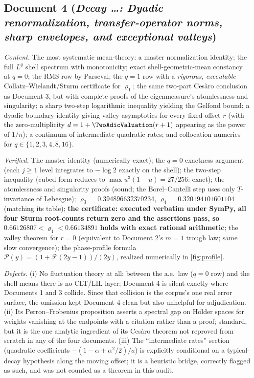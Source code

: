 \documentclass[11pt,oneside]{article}
\theoremstyle{definition}
\theoremstyle{remark}
\begin{document}
\subsection{Document 4 (\emph{Decay \dots: Dyadic renormalization,
transfer-operator norms, sharp envelopes, and exceptional valleys})}

\emph{Content.}  The most systematic mean-theory: a master normalization
identity; the full $L^q$ shell spectrum with monotonicity; exact
shell-geometric-mean constancy at $q=0$; the RMS row by Parseval; the
$q=1$ row with a \emph{rigorous, executable} Collatz--Wielandt/Sturm
certificate for $\varrho_1$; the same two-part Ces\`aro conclusion as
Document 3, but with complete proofs of the eigenmeasure's atomlessness
and singularity; a sharp two-step logarithmic inequality yielding the
Gelfond bound; a dyadic-boundary identity giving valley asymptotics for
every fixed offset $r$ (with the zero-multiplicity $d=1+\TwoAdicValuation(r+1)$
appearing as the power of $1/n$); a continuum of intermediate quadratic
rates; and collocation numerics for $q\in\{1,2,3,4,8,16\}$.

\emph{Verified.}  The master identity (numerically exact); the $q=0$
exactness argument (each $j\ge1$ level integrates to $-\log2$ exactly on
the shell); the two-step inequality (cubed form reduces to
$\max u^3(1-u)=27/256$: exact); the atomlessness and singularity proofs
(sound; the Borel--Cantelli step uses only $T$-invariance of Lebesgue);
$\varrho_3=0.394896632370234$, $\varrho_4=0.320194101601104$ (matching
its table); \textbf{the certificate: executed verbatim under SymPy,
all four Sturm root-counts return zero and the assertions pass, so}
$0.66126807<\varrho_1<0.66134891$ \textbf{holds with exact rational
arithmetic}; the valley theorem for $r=0$ (equivalent to Document 2's
$m=1$ trough law; same slow convergence); the phase-profile formula
$\mathscr P(y)=(1+\mathscr F(2y-1))/(2y)$, realized numerically in
\cref{fig:profile}.

\emph{Defects.}
(i) No fluctuation theory at all: between the a.e.\ law ($q=0$ row) and
the shell means there is no CLT/LIL layer; Document 4 is silent exactly
where Documents 1 and 3 collide.  Since that collision is the corpus's
one real error surface, the omission kept Document 4 clean but also
unhelpful for adjudication.
(ii) Its Perron--Frobenius proposition asserts a spectral gap on
H\"older spaces for weights vanishing at the endpoints with a citation
rather than a proof; standard, but it is the one analytic ingredient of
its Ces\`aro theorem not reproved from scratch in any of the four
documents.
(iii) The ``intermediate rates'' section (quadratic coefficients
$-(1-\alpha+\alpha^2/2)/a$) is explicitly conditional on a typical-decay
hypothesis along the moving offset; it is a heuristic bridge, correctly
flagged as such, and was not counted as a theorem in this audit.
\end{document}
